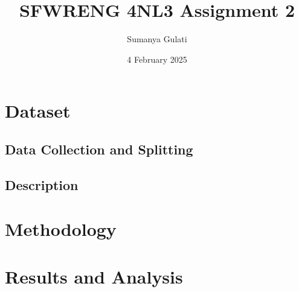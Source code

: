 \documentclass[titlepage]{article}
\title{SFWRENG 4NL3 Assignment 2}
\author{Sumanya Gulati}
\date{4 February 2025}
\begin{document}
\begin{titlepage}
    \maketitle
\end{titlepage}

\newpage 

\tableofcontents
\listoftables
\listoffigures

\newpage

\section{Dataset}

\subsection{Data Collection and Splitting}

\subsection{Description}
 
\section{Methodology}

\section{Results and Analysis}
\end{document}
